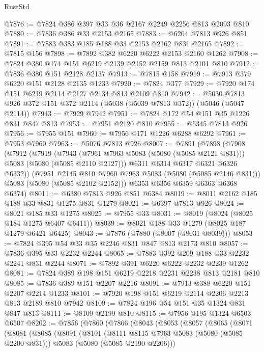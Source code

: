 \begin{lexlean}{RustStd}
\begin{coremodule}
@7876 := @7824 @386 @397 @33 @36 @2167 @2249 @2256 @813 @2093 @810
@7880 := @7836 @386 @33 @2153 @2165
@7883 := @6204 @7813 @926 @851
@7891 := @7883 @383 @185 @188 @33 @2153 @2162 @831 @2165
@7892 := @7815 @156
@7898 := @7892 @382 @6220 @6222 @2153 @2160 @1262
@7908 := @7824 @380 @174 @151 @6219 @2139 @2152 @2159 @813 @2101 @810
@7912 := @7836 @380 @151 @2128 @2137
@7913 := @7815 @158
@7919 := @7913 @379 @6220 @151 @2128 @2135 @1233
@7920 := @7824 @377
@7929 := @7920 @174 @151 @6219 @2114 @2127 @2134 @813 @2109 @810
@7942 := @5030 @7813 @926 @372 @151 @372 @2114 (@5038 (@5039 @7813 @372)) (@5046 (@5047 @2114))
@7943 := @7929 @7942
@7951 := @7824 @172 @54 @151 @35 @1226 @831 @847 @813
@7953 := @7951 @2120 @810
@7955 := @5345 @7813 @926
@7956 := @7955 @151
@7960 := @7956 @171 @1226 @6288 @6292
@7961 := @7953 @7960
@7963 := @5076 @7813 @926
@8007 := @7891
    (@7898
      (@7908
        (@7912
          (@7919
            (@7943 (@7961 @7963 @5083 (@5080 (@5085 @2121 @831))) @5083 (@5080 (@5085 @2110 @2127)))
            @6311
            @6314
            @6317
            @6321
            @6326
            @6332))
        (@7951 @2145 @810 @7960 @7963 @5083 (@5080 (@5085 @2146 @831)))
        @5083
        (@5080 (@5085 @2102 @2152)))
      @6353
      @6356
      @6359
      @6363
      @6368
      @6374)
@8011 := @6380 @7813 @926 @851 @6384
@8019 := @8011 @2162 @185 @188 @33 @831 @1275 @831 @1279
@8021 := @6397 @7813 @926
@8024 := @8021 @185 @33 @1275
@8025 := @7955 @33
@8031 := @8019 (@8024 (@8025 @184 @1275 @6407 @6411))
@8039 := @8021 @188 @33 @1279 (@8025 @187 @1279 @6421 @6425)
@8043 := @7876 (@7880 (@8007 (@8031 @8039)))
@8053 := @7824 @395 @54 @33 @35 @2246 @831 @847 @813 @2173 @810
@8057 := @7836 @395 @33 @2232 @2244
@8065 := @7883 @392 @209 @188 @33 @2232 @2241 @831 @2244
@8071 := @7892 @391 @6220 @6222 @2232 @2239 @1262
@8081 := @7824 @389 @198 @151 @6219 @2218 @2231 @2238 @813 @2181 @810
@8085 := @7836 @389 @151 @2207 @2216
@8091 := @7913 @388 @6220 @151 @2207 @2214 @1233
@8101 := @7920 @198 @151 @6219 @2114 @2206 @2213 @813 @2189 @810 @7942
@8109 := @7824 @196 @54 @151 @35 @1324 @831 @847 @813
@8111 := @8109 @2199 @810
@8115 := @7956 @195 @1324 @6503 @6507
@8202 := @7856
    (@7860
      (@7866
        (@8043
          (@8053
            (@8057
              (@8065
                (@8071
                  (@8081
                    (@8085
                      (@8091
                        (@8101
                          (@8111 @8115 @7963 @5083 (@5080 (@5085 @2200 @831)))
                          @5083
                          (@5080 (@5085 @2190 @2206)))

\end{coremodule}
\end{lexlean}
